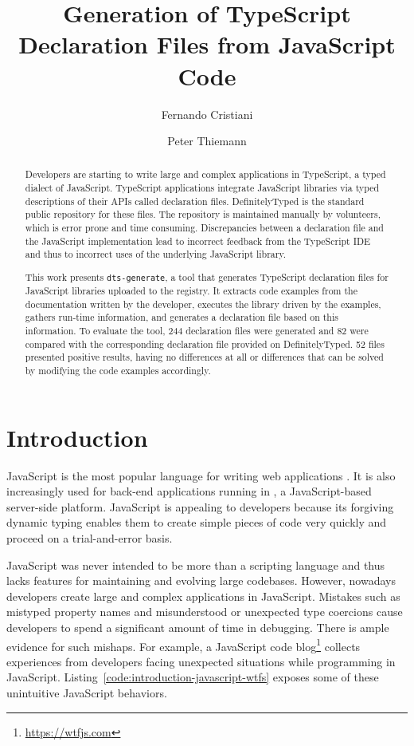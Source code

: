\documentclass[english,cleveref,autoref,submission]{programming}
\title{Generation of TypeScript Declaration Files from JavaScript Code}
\author{Fernando Cristiani}
\affiliation{Hochschule Karlsruhe, Germany}
\author{Peter Thiemann}
\affiliation{Universität Freiburg, Germany}
\newcommand{\coderef}[1]{Listing~\ref{#1}}
\begin{document}
\maketitle

\begin{abstract}
Developers are starting to write large and complex applications in
TypeScript, a typed dialect of JavaScript. TypeScript applications
integrate JavaScript libraries via typed descriptions of their APIs
called declaration files. DefinitelyTyped is the standard public
repository for these files.
The repository is maintained manually by volunteers, which
is error prone and time consuming. Discrepancies between a
declaration file and the JavaScript implementation lead to
incorrect feedback from the TypeScript IDE and thus to incorrect uses
of the underlying JavaScript library.

This work presents \texttt{dts-generate}, a tool that generates
TypeScript declaration files for JavaScript libraries uploaded to the \NPM{}
registry. It extracts code examples from the documentation written by
the developer, executes the library driven by the examples, gathers
run-time information, and generates a declaration file based on this
information. To evaluate the tool, 244 declaration files were generated and 82 were
compared with the corresponding declaration file provided on DefinitelyTyped. 52 files presented positive results, having no differences at all or differences that can be solved by modifying the code examples accordingly.

\end{abstract}

\section{Introduction}
\label{sec:introduction}
JavaScript is the most popular language for writing web
applications \cite{github-statistics}. It is also increasingly used
for back-end applications running in \NodeJS{}, a JavaScript-based
server-side platform. JavaScript is appealing to developers because
its forgiving dynamic typing enables 
them to create simple pieces of code very quickly and proceed on a
trial-and-error basis.

JavaScript was never intended to be more than a
scripting language and thus lacks features for maintaining and evolving large
codebases. However, nowadays developers create large and complex
applications in JavaScript. 
Mistakes such as mistyped property
names and misunderstood or unexpected type coercions cause developers
to spend a significant amount of time in debugging. There is ample
evidence for such mishaps. For example, a 
JavaScript code blog\footnote{\url{https://wtfjs.com}} collects experiences
from developers facing unexpected situations while programming in
JavaScript. \coderef{code:introduction-javascript-wtfs} exposes some
of these unintuitive JavaScript behaviors. 
\end{document}
